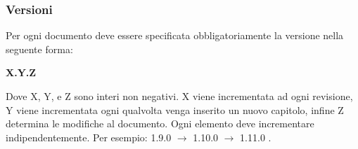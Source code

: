 \subsubsection{Versioni}
\label{sec:documentversion}
Per ogni documento deve essere specificata obbligatoriamente la versione nella seguente forma: 
\begin{center}
\textbf{X.Y.Z}
\end{center}
Dove X, Y, e Z sono interi non negativi. X viene incrementata ad ogni revisione, Y viene incrementata ogni qualvolta venga inserito un nuovo capitolo, infine Z determina le modifiche al documento. Ogni elemento deve incrementare indipendentemente. Per esempio: 1.9.0 $\rightarrow$ 1.10.0 $\rightarrow$ 1.11.0 .


